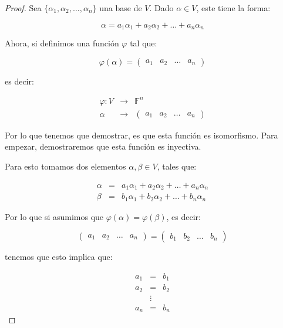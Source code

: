 		\begin{proof}
			Sea $\{ \alpha_1, \alpha_2, \dots, \alpha_n \}$ una base de $V$. Dado $\alpha \in V$, este tiene la forma:

			\begin{equation*}
				\alpha = a_1 \alpha_1 + a_2 \alpha_2 + \dots + a_n \alpha_n
			\end{equation*}

			Ahora, si definimos una función $\varphi$ tal que:

			\begin{equation*}
				\varphi(\alpha) =
				\begin{pmatrix}
					a_1 & a_2 & \dots & a_n
				\end{pmatrix}
			\end{equation*}

			es decir:

			\begin{eqnarray*}
				\varphi \colon V & \to & \mathbb{F}^n \\
				\alpha & \to & \begin{pmatrix} a_1 & a_2 & \dots & a_n \end{pmatrix}
			\end{eqnarray*}

			Por lo que tenemos que demostrar, es que esta función es isomorfismo.
			Para empezar, demostraremos que esta función es inyectiva.

			Para esto tomamos dos elementos $\alpha, \beta \in V$, tales que:

			\begin{eqnarray*}
				\alpha & = & a_1 \alpha_1 + a_2 \alpha_2 + \dots + a_n \alpha_n \\
				\beta & = & b_1 \alpha_1 + b_2 \alpha_2 + \dots + b_n \alpha_n
			\end{eqnarray*}

			Por lo que si asumimos que $\varphi(\alpha) = \varphi(\beta)$, es decir:

			\begin{equation}
				\begin{pmatrix}
					a_1 & a_2 & \dots & a_n
				\end{pmatrix} =
				\begin{pmatrix}
					b_1 & b_2 & \dots & b_n
				\end{pmatrix}
			\end{equation}

			tenemos que esto implica que:

			\begin{eqnarray*}
				a_1 & = & b_1 \\
				a_2 & = & b_2 \\
				& \vdots & \\
				a_n & = & b_n
			\end{eqnarray*}


\end{proof}

